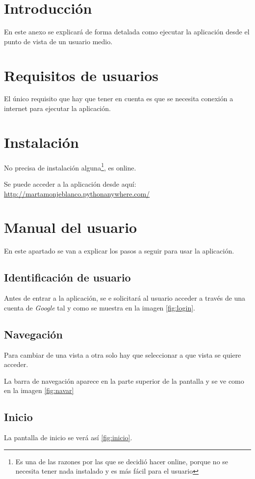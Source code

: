 
\section{Introducción}
En este anexo se explicará de forma detalada como ejecutar la aplicación desde el punto de vista de un usuario medio.
\section{Requisitos de usuarios}
El único requisito que hay que tener en cuenta es que se necesita conexión a internet para ejecutar la aplicación.
\section{Instalación}
No precisa de instalación alguna\footnote{Es una de las razones por las que se decidió hacer online, porque no se necesita tener nada instalado y es más fácil para el usuario}, es online.

Se puede acceder a la aplicación desde aquí: \url{
	http://martamonjeblanco.pythonanywhere.com/}
\section{Manual del usuario}

En este apartado se van a explicar los pasos a seguir para usar la aplicación.

\subsection{Identificación de usuario}
Antes de entrar a la aplicación, se e solicitará al usuario acceder a través de una cuenta de \textit{Google} tal y como se muestra en la imagen \ref{fig:login}.

\subsection{Navegación}
Para cambiar de una vista a otra solo hay que seleccionar a que vista se quiere acceder.

La barra de navegación aparece en la parte superior de la pantalla y se ve como en la imagen \ref{fig:navar}

\subsection{Inicio}
La pantalla de inicio se verá así \ref{fig:inicio}.

